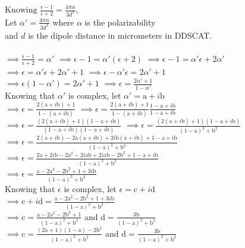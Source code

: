 \noindent $\textrm{Knowing } \frac{\epsilon-1}{\epsilon+2}=\frac{4\pi\alpha}{3d^3}$, \\

\noindent Let $\alpha'=\frac{4\pi\alpha}{3d^3}$ where $\alpha$ is the polarizability \\ and $d$ is the dipole distance in micrometers in DDSCAT.\\\\
\noindent$\implies\frac{\epsilon-1}{\epsilon+2}=\alpha'$
$\implies\epsilon-1=\alpha'(\epsilon+2)$
$\implies\epsilon-1=\alpha'\epsilon+2\alpha'$\\
\noindent$\implies\epsilon=\alpha'\epsilon+2\alpha'+1$
$\implies\epsilon-\alpha'\epsilon=2\alpha'+1$\\
\noindent$\implies\epsilon(1-\alpha')=2\alpha'+1$
$\implies\epsilon=\frac{2\alpha'+1}{1-\alpha'}$\\

\noindent Knowing that $\alpha'$ is complex, let $\alpha'=\textrm{a}+i\textrm{b}$\\
\noindent$\implies\epsilon=\frac{2(\textrm{a}+i\textrm{b})+1}{1-(\textrm{a}+i\textrm{b})}$
$\implies\epsilon=\frac{2(\textrm{a}+i\textrm{b})+1}{1-(\textrm{a}+i\textrm{b})}\frac{1-\textrm{a}+i\textrm{b}}{1-\textrm{a}+i\textrm{b}}$\\
\noindent$\implies\epsilon=\frac{(2(\textrm{a}+i\textrm{b})+1)(1-\textrm{a}+i\textrm{b})}{(1-\textrm{a}+i\textrm{b})(1-\textrm{a}+i\textrm{b})}$
$\implies\epsilon=\frac{(2(\textrm{a}+i\textrm{b})+1)(1-\textrm{a}+i\textrm{b})}{(1-\textrm{a})^2+\textrm{b}^2}$\\
\noindent$\implies\epsilon=\frac{2(\textrm{a}+i\textrm{b})-2\textrm{a}(\textrm{a}+i\textrm{b})+2i\textrm{b}(\textrm{a}+i\textrm{b})+1-\textrm{a}+i\textrm{b}}{(1-\textrm{a})^2+\textrm{b}^2}$\\
\noindent$\implies\epsilon=\frac{2\textrm{a}+2i\textrm{b}-2\textrm{a}^2-2i\textrm{a}\textrm{b}+2i\textrm{a}\textrm{b}-2\textrm{b}^2+1-\textrm{a}+i\textrm{b}}{(1-\textrm{a})^2+\textrm{b}^2}$\\
\noindent$\implies\epsilon=\frac{\textrm{a}-2\textrm{a}^2-2\textrm{b}^2+1+3i\textrm{b}}{(1-\textrm{a})^2+\textrm{b}^2}$\\

\noindent Knowing that $\epsilon$ is complex, let $\epsilon=\textrm{c}+i\textrm{d}$\\
\noindent$\implies\textrm{c}+i\textrm{d}=\frac{\textrm{a}-2\textrm{a}^2-2\textrm{b}^2+1+3i\textrm{b}}{(1-\textrm{a})^2+\textrm{b}^2}$\\
\noindent$\implies\textrm{c}=\frac{\textrm{a}-2\textrm{a}^2-2\textrm{b}^2+1}{(1-\textrm{a})^2+\textrm{b}^2}$ and $\textrm{d}=\frac{3\textrm{b}}{(1-\textrm{a})^2+\textrm{b}^2}$\\
\noindent$\implies\textrm{c}=\frac{(2\textrm{a}+1)(1-\textrm{a})-2\textrm{b}^2}{(1-\textrm{a})^2+\textrm{b}^2}$ and $\textrm{d}=\frac{3\textrm{b}}{(1-\textrm{a})^2+\textrm{b}^2}$



